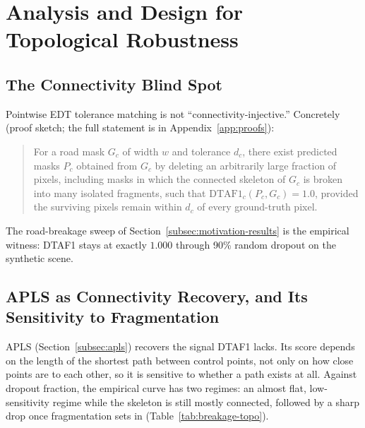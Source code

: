 \section{Analysis and Design for Topological Robustness}
\label{sec:topological}

\subsection{The Connectivity Blind Spot}
\label{subsec:blindspot}

Pointwise EDT tolerance matching is not ``connectivity-injective.'' Concretely (proof sketch; the
full statement is in Appendix~\ref{app:proofs}):

\begin{quote}
For a road mask $G_c$ of width $w$ and tolerance $d_c$, there exist predicted masks $P_c$ obtained
from $G_c$ by deleting an arbitrarily large fraction of pixels, including masks in which the
connected skeleton of $G_c$ is broken into many isolated fragments, such that
$\mathrm{DTAF1}_c(P_c, G_c) = 1.0$, provided the surviving pixels remain within $d_c$ of every
ground-truth pixel.
\end{quote}

The road-breakage sweep of Section~\ref{subsec:motivation-results} is the empirical witness: DTAF1
stays at exactly $1.000$ through 90\% random dropout on the synthetic scene.

\subsection{APLS as Connectivity Recovery, and Its Sensitivity to Fragmentation}
\label{subsec:apls-recovery}

APLS (Section~\ref{subsec:apls}) recovers the signal DTAF1 lacks. Its score depends on the length of
the shortest path between control points, not only on how close points are to each other, so it is
sensitive to whether a path exists at all. Against dropout fraction, the empirical curve has two
regimes: an almost flat, low-sensitivity regime while the skeleton is still
mostly connected, followed by a sharp drop once fragmentation sets in
(Table~\ref{tab:breakage-topo}).

